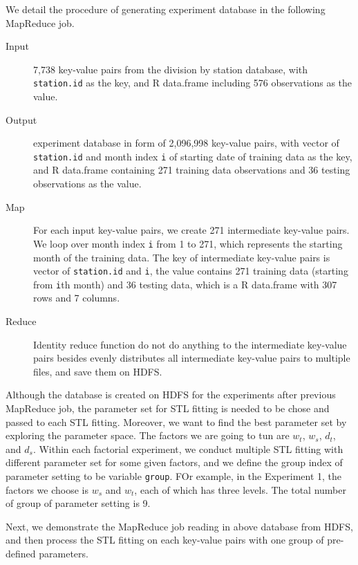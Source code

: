 We detail the procedure of generating experiment database in the following 
MapReduce job.

\begin{description}
  \item[Input] 7,738 key-value pairs from the division by station database, with 
  \texttt{station.id} as the key, and R data.frame including 576 observations as
  the value.
  \item[Output] experiment database in form of 2,096,998 key-value pairs, with 
  vector of \texttt{station.id} and month index \texttt{i} of starting date of 
  training data as the key, and R data.frame containing 271 training data 
  observations and 36 testing observations as the value.
  \item[Map] For each input key-value pairs, we create 271 intermediate key-value
  pairs. We loop over month index \texttt{i} from 1 to 271, which represents the
  starting month of the training data. The key of intermediate key-value pairs
  is vector of \texttt{station.id} and \texttt{i}, the value contains 271 
  training data (starting from \texttt{i}th month) and 36 testing data, which is 
  a R data.frame with 307 rows and 7 columns.
  \item[Reduce] Identity reduce function do not do anything to the intermediate 
  key-value pairs besides evenly distributes all intermediate key-value pairs to 
  multiple files, and save them on HDFS.
\end{description} 

Although the database is created on HDFS for the experiments after previous 
MapReduce job, the parameter set for STL fitting is needed to be chose and passed 
to each STL fitting. Moreover, we want to find the best parameter set by exploring
the parameter space. The factors we are going to tun are $w_t$, $w_s$, $d_t$, 
and $d_s$. Within each factorial experiment, we conduct multiple STL fitting with 
different parameter set for some given factors, and we define the group index of 
parameter setting to be variable \texttt{group}. FOr example, in the Experiment 1,
the factors we choose is $w_s$ and $w_t$, each of which has three levels. The 
total number of group of parameter setting is 9.

Next, we demonstrate the MapReduce job reading in above database from HDFS, and 
then process the STL fitting on each key-value pairs with one group of pre-defined 
parameters. 

